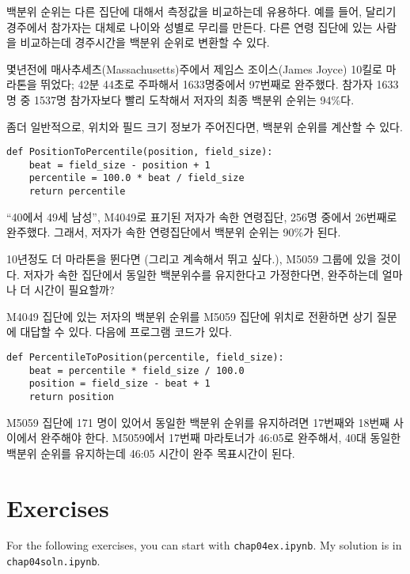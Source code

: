 백분위 순위는 다른 집단에 대해서 측정값을 비교하는데 유용하다.
예를 들어, 달리기 경주에서 참가자는 대체로 나이와 성별로 무리를 만든다.
다른 연령 집단에 있는 사람을 비교하는데 경주시간을 백분위 순위로 변환할 수 있다.


몇년전에 매사추세츠(Massachusetts)주에서 제임스 조이스(James Joyce) 10킬로 마라톤을 뛰었다;
42분 44초로 주파해서 1633명중에서 97번째로 완주했다. 참가자 1633명 중 1537명 참가자보다 빨리 도착해서 
저자의 최종 백분위 순위는 94\%다.  


좀더 일반적으로, 위치와 필드 크기 정보가 주어진다면, 백분위 순위를 계산할 수 있다.

\begin{verbatim}
def PositionToPercentile(position, field_size):
    beat = field_size - position + 1
    percentile = 100.0 * beat / field_size
    return percentile
\end{verbatim}

``40에서 49세 남성'', M4049로 표기된 저자가 속한 연령집단, 256명 중에서 26번째로 완주했다.
그래서, 저자가 속한 연령집단에서 백분위 순위는 90\%가 된다.

10년정도 더 마라톤을 뛴다면 (그리고 계속해서 뛰고 싶다.), M5059 그룹에 있을 것이다.
저자가 속한 집단에서 동일한 백분위수를 유지한다고 가정한다면, 완주하는데 얼마나 더 시간이 필요할까?

M4049 집단에 있는 저자의 백분위 순위를 M5059 집단에 위치로 전환하면 상기 질문에 대답할 수 있다.
다음에 프로그램 코드가 있다.

\begin{verbatim}
def PercentileToPosition(percentile, field_size):
    beat = percentile * field_size / 100.0
    position = field_size - beat + 1
    return position
\end{verbatim}

M5059 집단에 171 명이 있어서 동일한 백분위 순위를 유지하려면 17번째와 18번째 사이에서 완주해야 한다.
M5059에서 17번째 마라토너가 46:05로 완주해서, 40대 동일한 백분위 순위를 유지하는데 
46:05 시간이 완주 목표시간이 된다.


\section{Exercises}

For the following exercises, you can start with \verb"chap04ex.ipynb".
My solution is in \verb"chap04soln.ipynb".

